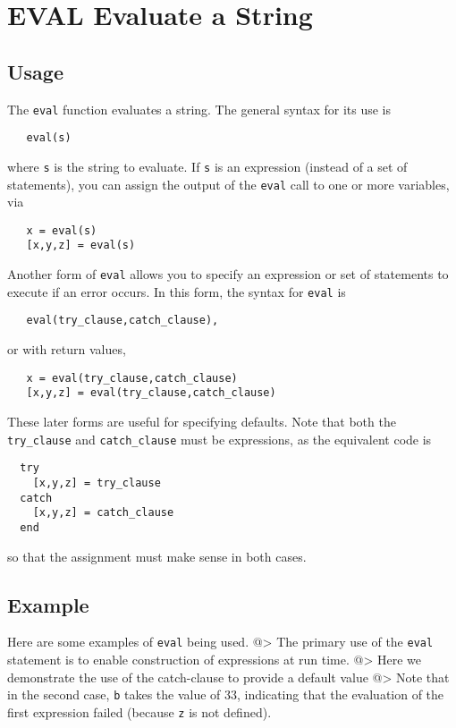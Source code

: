 \section{EVAL Evaluate a String}

\subsection{Usage}

The \verb|eval| function evaluates a string.  The general syntax
for its use is
\begin{verbatim}
   eval(s)
\end{verbatim}
where \verb|s| is the string to evaluate.  If \verb|s| is an expression
(instead of a set of statements), you can assign the output
of the \verb|eval| call to one or more variables, via
\begin{verbatim}
   x = eval(s)
   [x,y,z] = eval(s)
\end{verbatim}

Another form of \verb|eval| allows you to specify an expression or
set of statements to execute if an error occurs.  In this 
form, the syntax for \verb|eval| is
\begin{verbatim}
   eval(try_clause,catch_clause),
\end{verbatim}
or with return values,
\begin{verbatim}
   x = eval(try_clause,catch_clause)
   [x,y,z] = eval(try_clause,catch_clause)
\end{verbatim}
These later forms are useful for specifying defaults.  Note that
both the \verb|try_clause| and \verb|catch_clause| must be expressions,
as the equivalent code is
\begin{verbatim}
  try
    [x,y,z] = try_clause
  catch
    [x,y,z] = catch_clause
  end
\end{verbatim}
so that the assignment must make sense in both cases.
\subsection{Example}

Here are some examples of \verb|eval| being used.
@>
The primary use of the \verb|eval| statement is to enable construction
of expressions at run time.
@>
Here we demonstrate the use of the catch-clause to provide a 
default value
@>
Note that in the second case, \verb|b| takes the value of 33, indicating
that the evaluation of the first expression failed (because \verb|z| is
not defined).
